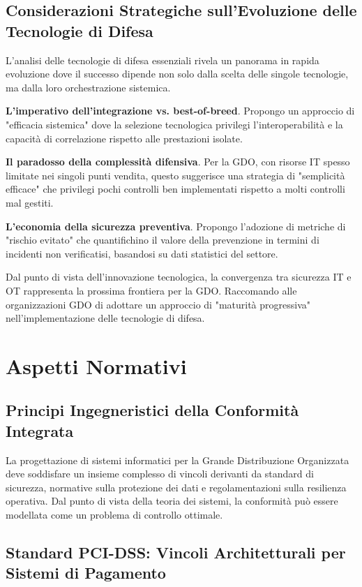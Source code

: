 \documentclass[12pt,a4paper,oneside]{book}
\begin{document}
\subsection{Considerazioni Strategiche sull'Evoluzione delle Tecnologie di Difesa}

L'analisi delle tecnologie di difesa essenziali rivela un panorama in rapida evoluzione dove il successo dipende non solo dalla scelta delle singole tecnologie, ma dalla loro orchestrazione sistemica.

\textbf{L'imperativo dell'integrazione vs. best-of-breed}. Propongo un approccio di "efficacia sistemica" dove la selezione tecnologica privilegi l'interoperabilità e la capacità di correlazione rispetto alle prestazioni isolate.

\textbf{Il paradosso della complessità difensiva}. Per la GDO, con risorse IT spesso limitate nei singoli punti vendita, questo suggerisce una strategia di "semplicità efficace" che privilegi pochi controlli ben implementati rispetto a molti controlli mal gestiti.

\textbf{L'economia della sicurezza preventiva}. Propongo l'adozione di metriche di "rischio evitato" che quantifichino il valore della prevenzione in termini di incidenti non verificatisi, basandosi su dati statistici del settore.

Dal punto di vista dell'innovazione tecnologica, la convergenza tra sicurezza IT e OT rappresenta la prossima frontiera per la GDO. Raccomando alle organizzazioni GDO di adottare un approccio di "maturità progressiva" nell'implementazione delle tecnologie di difesa.

\section{Aspetti Normativi}

\subsection{Principi Ingegneristici della Conformità Integrata}

La progettazione di sistemi informatici per la Grande Distribuzione Organizzata deve soddisfare un insieme complesso di vincoli derivanti da standard di sicurezza, normative sulla protezione dei dati e regolamentazioni sulla resilienza operativa. Dal punto di vista della teoria dei sistemi, la conformità può essere modellata come un problema di controllo ottimale.

\subsection{Standard PCI-DSS: Vincoli Architetturali per Sistemi di Pagamento}
\end{document}
